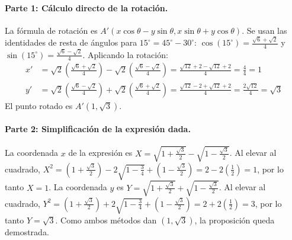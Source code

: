 \documentclass[12pt, letterpaper]{article}
\begin{document}
\paragraph{Parte 1: Cálculo directo de la rotación.}
La fórmula de rotación es $A'(x\cos\theta - y\sin\theta, x\sin\theta + y\cos\theta)$. Se usan las identidades de resta de ángulos para $15^\circ=45^\circ-30^\circ$:
$\cos(15^\circ) = \frac{\sqrt{6}+\sqrt{2}}{4}$ y $\sin(15^\circ) = \frac{\sqrt{6}-\sqrt{2}}{4}$.
Aplicando la rotación:
\begin{align*}
	x' &= \sqrt{2}\left(\frac{\sqrt{6} + \sqrt{2}}{4}\right) - \sqrt{2}\left(\frac{\sqrt{6} - \sqrt{2}}{4}\right) = \frac{\sqrt{12} + 2 - \sqrt{12} + 2}{4} = \frac{4}{4} = 1 \\
	y' &= \sqrt{2}\left(\frac{\sqrt{6} - \sqrt{2}}{4}\right) + \sqrt{2}\left(\frac{\sqrt{6} + \sqrt{2}}{4}\right) = \frac{\sqrt{12} - 2 + \sqrt{12} + 2}{4} = \frac{2\sqrt{12}}{4} = \sqrt{3}
\end{align*}
El punto rotado es $A'(1, \sqrt{3})$.
\paragraph{Parte 2: Simplificación de la expresión dada.}
La coordenada $x$ de la expresión es $X = \sqrt{1 + \frac{\sqrt{3}}{2}} - \sqrt{1 - \frac{\sqrt{3}}{2}}$. Al elevar al cuadrado, $X^2 = (1 + \frac{\sqrt{3}}{2}) - 2\sqrt{1-\frac{3}{4}} + (1 - \frac{\sqrt{3}}{2}) = 2 - 2(\frac{1}{2}) = 1$, por lo tanto $X=1$.
La coordenada $y$ es $Y = \sqrt{1 + \frac{\sqrt{3}}{2}} + \sqrt{1 - \frac{\sqrt{3}}{2}}$. Al elevar al cuadrado, $Y^2 = (1 + \frac{\sqrt{3}}{2}) + 2\sqrt{1-\frac{3}{4}} + (1 - \frac{\sqrt{3}}{2}) = 2 + 2(\frac{1}{2}) = 3$, por lo tanto $Y=\sqrt{3}$.
Como ambos métodos dan $(1, \sqrt{3})$, la proposición queda demostrada.
\end{document}
